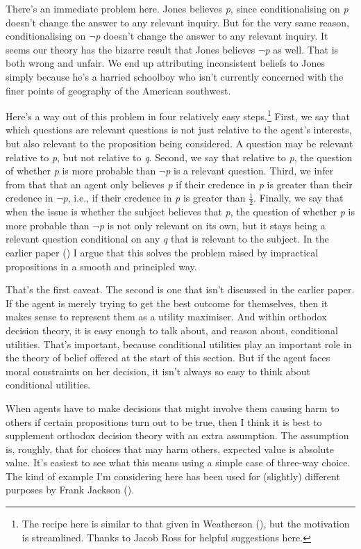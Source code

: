 \documentclass[
  11pt,
  letterpaper,
  DIV=11,
  numbers=noendperiod,
  twoside]{scrartcl}
\begin{document}
There's an immediate problem here. Jones believes \emph{p}, since
conditionalising on \emph{p} doesn't change the answer to any relevant
inquiry. But for the very same reason, conditionalising on
\(\neg\)\emph{p} doesn't change the answer to any relevant inquiry. It
seems our theory has the bizarre result that Jones believes
\(\neg\)\emph{p} as well. That is both wrong and unfair. We end up
attributing inconsistent beliefs to Jones simply because he's a harried
schoolboy who isn't currently concerned with the finer points of
geography of the American southwest.

Here's a way out of this problem in four relatively easy
steps.\footnote{The recipe here is similar to that given in Weatherson
  (), but the motivation is
  streamlined. Thanks to Jacob Ross for helpful suggestions here.}
First, we say that which questions are relevant questions is not just
relative to the agent's interests, but also relevant to the proposition
being considered. A question may be relevant relative to \emph{p}, but
not relative to \emph{q}. Second, we say that relative to \emph{p}, the
question of whether \emph{p} is more probable than \(\neg\)\emph{p} is a
relevant question. Third, we infer from that that an agent only believes
\emph{p} if their credence in \emph{p} is greater than their credence in
\(\neg\)\emph{p}, i.e., if their credence in \emph{p} is greater than
\(\frac{1}{2}\). Finally, we say that when the issue is whether the
subject believes that \emph{p}, the question of whether \emph{p} is more
probable than \(\neg\)\emph{p} is not only relevant on its own, but it
stays being a relevant question conditional on any \emph{q} that is
relevant to the subject. In the earlier paper
() I argue that
this solves the problem raised by impractical propositions in a smooth
and principled way.

That's the first caveat. The second is one that isn't discussed in the
earlier paper. If the agent is merely trying to get the best outcome for
themselves, then it makes sense to represent them as a utility
maximiser. And within orthodox decision theory, it is easy enough to
talk about, and reason about, conditional utilities. That's important,
because conditional utilities play an important role in the theory of
belief offered at the start of this section. But if the agent faces
moral constraints on her decision, it isn't always so easy to think
about conditional utilities.

When agents have to make decisions that might involve them causing harm
to others if certain propositions turn out to be true, then I think it
is best to supplement orthodox decision theory with an extra assumption.
The assumption is, roughly, that for choices that may harm others,
expected value is absolute value. It's easiest to see what this means
using a simple case of three-way choice. The kind of example I'm
considering here has been used for (slightly) different purposes by
Frank Jackson ().
\end{document}
